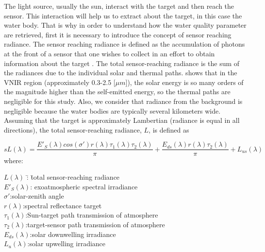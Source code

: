 The light source, usually the sun, interact with the target and then reach the sensor. This interaction will help us to extract about the target, in this case the water body. That is why in order to understand how the water quality parameter are retrieved, first it is necessary to introduce the concept of sensor reaching radiance. The sensor reaching radiance is defined as the accumulation of photons at the front of a sensor that one wishes to collect in an effort to obtain information about the target \cite{GeraceThesis} . The total sensor-reaching radiance is the sum of the radiances due to the individual solar and thermal paths.  \cite{Schott} shows that in the VNIR region (approximately 0.3-2.5 [$\mu m$]), the solar energy is so many orders of the magnitude higher than the self-emitted energy, so the thermal paths are negligible for this study. Also, we consider that radiance from the background is negligible because the water bodies are typically several kilometers wide. Assuming that the target is approximately Lambertian (radiance is equal in all directions), the total sensor-reaching radiance, $L$, is defined as

\begin{equation} \label{eq:gov1}s
L(\lambda) = \frac{E'_S(\lambda)cos(\sigma')r(\lambda)\tau_1(\lambda)\tau_2(\lambda)}{\pi} +
                        \frac{E_{ds}(\lambda)r(\lambda)\tau_2(\lambda)}{\pi} + L_{us}(\lambda)
\end{equation} 
where:
\begin{tabbing}
\indent \indent \indent  $L(\lambda)$ \hspace{1mm}\=:  \indent \= total sensor-reaching radiance\\
\indent \indent \indent  $E'_S(\lambda)$\>: \>exoatmospheric spectral irradiance\\
\indent \indent \indent $\sigma'$\>:\>solar-zenith angle\\
\indent \indent \indent $r(\lambda)$\>:\>spectral reflectance target\\
\indent \indent \indent $\tau_1(\lambda)$\>:\>Sun-target path transmission of atmosphere\\
\indent \indent \indent $\tau_2(\lambda)$\>:\>target-sensor path transmission of atmosphere\\
\indent \indent \indent $E_{ds}(\lambda)$\>:\>solar downwelling irradiance\\
\indent \indent \indent $L_{u}(\lambda)$\>:\>solar upwelling irradiance\\
\end{tabbing}

